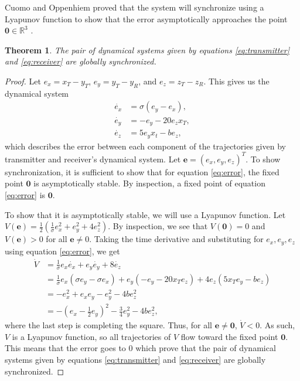 \documentclass[12pt]{article}
\newtheorem{theorem}{Theorem}[section]
\begin{document}
    Cuomo and Oppenhiem proved that the system will synchronize using a Lyapunov function to show that the error asymptotically approaches the point $\mathbf{0} \in \mathbb{R}^3$ \cite{cuomo1993}. 
      \begin{theorem}
        The pair of dynamical systems given by equations \ref{eq:transmitter} and \ref{eq:receiver} are globally synchronized. 
      \end{theorem}
      \begin{proof} 
       Let $e_x = x_T - y_T$, $e_y = y_T - y_R$, and $e_z = z_T - z_R$. This gives us the dynamical system 
       \begin{equation}\label{eq:error}
        \begin{aligned}
         \dot{e_x} &= \sigma (e_y - e_x), \\ 
         \dot{e_y} &= -e_y - 20e_z x_T, \\
         \dot{e_z} &= 5e_y x_t - be_z,  
        \end{aligned} 
       \end{equation}
       which describes the error between each component of the trajectories given by transmitter and receiver's dynamical system. Let $\mathbf{e} = (e_x,e_y,e_z)^T$. To show synchronization, it is sufficient to show that for equation \ref{eq:error}, the fixed point $\mathbf{0}$ is asymptotically stable. By inspection, a fixed point of equation \ref{eq:error} is $\mathbf{0}$. 
       
       To show that it is asymptotically stable, we will use a Lyapunov function. Let $V(\mathbf{e}) = \frac{1}{2} \left( \frac{1}{\sigma} e_x^2 + e_y^2 + 4e_z^2 \right)$. By inspection, we see that $V(\mathbf{0}) = 0$ and $V(\mathbf{e}) > 0$ for all $\mathbf{e} \neq 0$. Taking the time derivative and substituting for $e_x,e_y,e_z$ using equation \ref{eq:error}, we get 
       \begin{align*} 
         \dot{V} &= \frac{1}{\sigma} e_x \dot{e_x} + e_y \dot{e_y} + 8 \dot{e_z} \\
         &= \frac{1}{\sigma} e_x (\sigma e_y - \sigma e_x) + e_y (-e_y - 20x_T e_z) + 4 e_z (5x_T e_y - be_z) \\ 
         &= -e_x^2 + e_x e_y - e_y^2 - 4be_z^2 \\
         &= - \left( e_x - \frac{1}{2}e_y \right)^2 - \frac{3}{4} e_y^2 - 4be_z^2,
       \end{align*}
       where the last step is completing the square. Thus, for all $\mathbf{e} \neq \mathbf{0}$, $\dot{V} < 0$. As such, $V$ is a Lyapunov function, so all trajectories of $V$ flow toward the fixed point $\mathbf{0}$. This means that the error goes to $0$ which prove that the pair of dynamical systems given by equations \ref{eq:transmitter} and \ref{eq:receiver} are globally synchronized.
      \end{proof}
\end{document}
